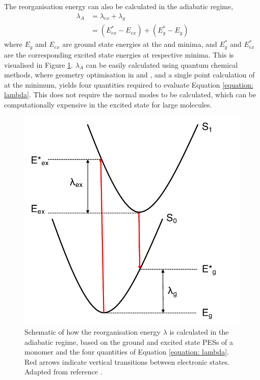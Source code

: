 The reorganisation energy can also be calculated in the adiabatic regime,\cite{Reimers2001}
\begin{equation}
\begin{split}
\lambda_{A}&=\lambda_{ex}+\lambda_{g}\\
&=(E_{ex}^*-E_{ex})+(E_{g}^*-E_g)
\label{equation: lambda}
\end{split}
\end{equation}
where $E_g$ and $E_{ex}$ are ground state energies at the \szero{} and \sone{} minima, and $E_{g}^*$ and $E_{ex}^*$ are the corresponding excited state energies at respective minima.\cite{Bredas2004} This is visualised in Figure \ref{figure: reorganisation_energy}. $\lambda_{A}$ can be easily calculated using quantum chemical methods, where geometry optimisation in \szero{} and \sone{}, and a single point calculation of \sone{} at the \szero{} minimum, yields four quantities required to evaluate Equation \ref{equation: lambda}. This does not require the normal modes to be calculated, which can be computationally expensive in the excited state for large molecules.

\begin{figure}[t]
\centering
  \includegraphics[width=0.6\linewidth]{1Intro/reorganisation_energy.pdf}
  \caption[Schematic of the reorganisation energy in the adiabatic regime]{Schematic of how the reorganisation energy $\lambda$ is calculated in the adiabatic regime, based on the ground and excited state \acp{PES} of a monomer and the four quantities of Equation \ref{equation: lambda}. Red arrows indicate vertical transitions between electronic states. Adapted from reference .}
  \label{figure: reorganisation_energy}
\end{figure}
